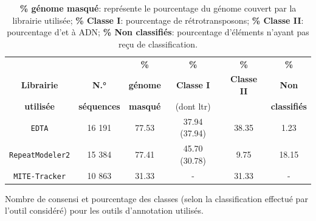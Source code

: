 \documentclass[10pt]{article}
\begin{document}
\begin{table}[h]
    \centering
    \begin{tabular}{c|*5c}
        \toprule
        & & \textbf{\%} & \textbf{\%} & \textbf{\%} & \textbf{\%} \\
\textbf{Librairie} & \textbf{N.°}  & \textbf{génome} & \textbf{Classe I} & \textbf{Classe II} & \textbf{Non} \\    
        \textbf{utilisée}   & \textbf{séquences} & \textbf{masqué} & (dont \acrshort{ltr}) & & \textbf{classifiés} \\
        \midrule
        \texttt{EDTA} & 16 191 & 77.53 & 37.94 (37.94) & 38.35 & 1.23 \\
        \texttt{RepeatModeler2} & 15 384 & 77.41 & 45.70 (30.78) & 9.75 & 18.15 \\
        \texttt{MITE-Tracker} & 10 863 & 31.33 & - & 31.33 & - \\
        \bottomrule
    \end{tabular}
    \caption{Nombre de consensi et pourcentage des classes (selon la classification effectué par l'outil considéré) pour les outils d'annotation utilisés.}
    \caption*{
    \scriptsize{
    \textbf{\% génome masqué}: représente le pourcentage du génome couvert par la librairie utilisée; 
    \textbf{\% Classe I}: pourcentage de rétrotransposons;
    \textbf{\% Classe II}: pourcentage d'\acrlong{et} à ADN;
    \textbf{\% Non classifiés}: pourcentage d'éléments n'ayant pas reçu de classification.
    }
    }
    \label{tab:results_annotation}
\end{table}
\end{document}
